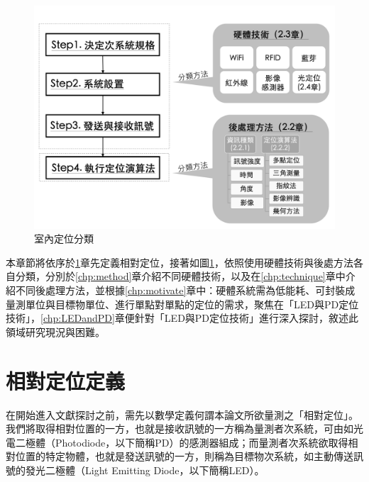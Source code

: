\begin{figure}[htpb]
    \centering
    \includegraphics[width=13cm]{ch2pic/pos_category.png}
    \caption{室內定位分類}
    \label{pic:pos_category}
\end{figure}


本章節將依序於\ref{chp:relative}章先定義相對定位，接著如圖\ref{pic:pos_category}，依照使用硬體技術與後處方法各自分類，分別於\ref{chp:method}章介紹不同硬體技術，以及在\ref{chp:technique}章中介紹不同後處理方法，並根據\ref{chp:motivate}章中：硬體系統需為低能耗、可封裝成量測單位與目標物單位、進行單點對單點的定位的需求，聚焦在「LED與PD定位技術」，\ref{chp:LEDandPD}章便針對「LED與PD定位技術」進行深入探討，敘述此領域研究現況與困難。


   





\section{相對定位定義}
\label{chp:relative}

    
    在開始進入文獻探討之前，需先以數學定義何謂本論文所欲量測之「相對定位」。我們將取得相對位置的一方，也就是接收訊號的一方稱為量測者次系統，可由如光電二極體（Photodiode，以下簡稱PD）的感測器組成；而量測者次系統欲取得相對位置的特定物體，也就是發送訊號的一方，則稱為目標物次系統，如主動傳送訊號的發光二極體（Light Emitting Diode，以下簡稱LED）。

